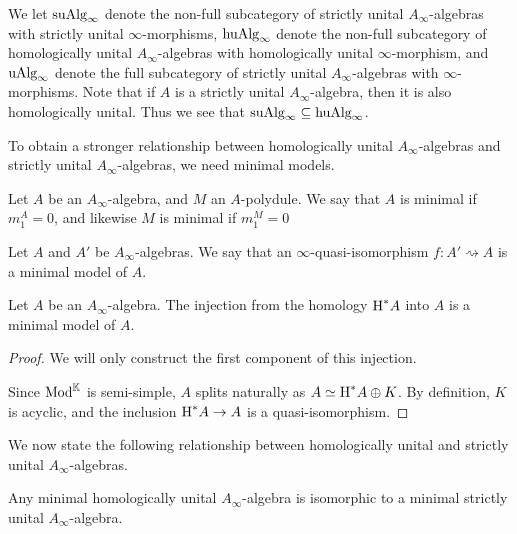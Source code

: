 \documentclass[../thesis.tex]{subfiles}
\begin{document}
            We let $\tt{suAlg}_\infty$ denote the non-full subcategory of strictly unital $A_\infty$-algebras with strictly unital $\infty$-morphisms, $\tt{huAlg}_\infty$ denote the non-full subcategory of homologically unital $A_\infty$-algebras with homologically unital $\infty$-morphism, and $\tt{uAlg}_\infty$ denote the full subcategory of strictly unital $A_\infty$-algebras with $\infty$-morphisms. Note that if $A$ is a strictly unital $A_\infty$-algebra, then it is also homologically unital. Thus we see that $\tt{suAlg}_\infty \subseteq \tt{huAlg}_\infty$.

            To obtain a stronger relationship between homologically unital $A_\infty$-algebras and strictly unital $A_\infty$-algebras, we need minimal models. 

            \begin{definition}
                Let $A$ be an $A_\infty$-algebra, and $M$ an $A$-polydule. We say that $A$ is minimal if $m_1^A = 0$, and likewise $M$ is minimal if $m_1^M = 0$
            \end{definition}

            \begin{definition}
                Let $A$ and $A'$ be $A_\infty$-algebras. We say that an $\infty$-quasi-isomorphism $f: A' \rightsquigarrow A$ is a minimal model of $A$.
            \end{definition}
            
            \begin{thm}\label{thm: minimal-models}
                Let $A$ be an $A_\infty$-algebra. The injection from the homology $\tt{H}^*A$ into $A$ is a minimal model of $A$.
            \end{thm}

            \begin{proof}
                We will only construct the first component of this injection.

                Since $\tt{Mod}^\mathbb{K}$ is semi-simple, $A$ splits naturally as $A \simeq \tt{H}^*A \oplus K$. By definition, $K$ is acyclic, and the inclusion $\tt{H}^*A \rightarrow A$ is a quasi-isomorphism. 
            \end{proof}

            We now state the following relationship between homologically unital and strictly unital $A_\infty$-algebras.

            \begin{thm}\label{thm: hu-to-su}
                Any minimal homologically unital $A_\infty$-algebra is isomorphic to a minimal strictly unital $A_\infty$-algebra.
            \end{thm}
\end{document}
